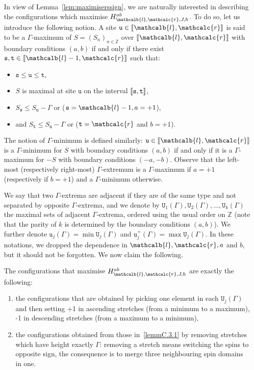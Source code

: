 \documentclass[AHL,Unicode,longabstracts,published]{cedram}
\newcommand{\Z}{\mathbb{Z}}
\newcommand{\bbZ}{\mathbb{Z}}
\newcommand{\gG}{\Gamma}
\renewcommand*\ss{\mathtt{u}}
\newcommand{\ttt}{\mathtt{t}}
\newcommand{\tu}{\ss}
\newcommand{\tU}{\mathtt{U}}
\newcommand{\ts}{\mathtt{s}}
\renewcommand{\ell}{\mathcalb{l}}
\newcommand{\err}{\mathcalc{r}}
\newcommand{\llbracket}{\mathopen{[\mkern -2.7mu[}}
\newcommand{\rrbracket}{\mathclose{]\mkern -2.7mu]}}
\newcommand{\lbra}{\llbracket}
\newcommand{\rbra}{\rrbracket}
\begin{document}
In view of Lemma~\ref{lem:maximiserssign}, we are naturally interested in describing the configurations which maximise $H_{\ell, \err, J, h}^{ab}$. To do so, let us introduce the following notion. A site $\tu\in\lbra \ell, \err \rbra$ is said to be a $\gG$-maximum of $S=(S_n)_{n\in\bbZ}$ over $\lbra \ell, \err \rbra$ with boundary conditions $(a,b)$ if and only if there exist $\ts, \ttt\in\lbra\ell-1, \err\rbra$ such that:
\begin{itemize}
\item $\ts\le \tu\le \ttt$,
\item $S$ is maximal at site $\tu$ on the interval $\lbra\ts, \ttt\rbra$,
\item $S_{\ts}\le S_{\tu}-\gG$ or ($\ts=\ell-1, a=+1$),
\item and $S_{\ttt}\le S_{\tu}-\gG$ or ($\ttt=\err$ and $b=+1$).
\end{itemize}
The notion of $\gG$-minimum is defined similarly: $\tu\in\lbra \ell, \err \rbra$ is a $\gG$-minimum for $S$ with boundary conditions $(a, b)$ if and only if it is a $\gG$-maximum for $-S$ with boundary conditions $(-a, -b)$. Observe that the left-most (respectively right-most) $\gG$-extremum is a $\gG$-maximum if $a=+1$ (respectively if $b=+1$) and a $\gG$-minimum otherwise.

We say that two $\gG$-extrema are adjacent if they are of the same type and not separated by opposite $\gG$-extrema, and we denote by $\tU_1(\gG), \tU_2(\gG), \dots, \tU_k(\gG)$ the maximal sets of adjacent $\gG$-extrema, ordered using the usual order on $\Z$ (note that the parity of $k$ is determined by the boundary conditions $(a, b)$). We further denote $\tu_j(\gG)=\min \tU_j(\gG)$ and $\tu_j^+(\gG)=\max \tU_j(\gG)$. In these notations, we dropped the dependence in $\ell, \err, a$ and $b$, but it should not be forgotten. We now claim the following.

\begin{lemm}\label{lem:descrmaxim}
The configurations that maximise $H_{\ell, \err, J, h}^{ab}$ are exactly the following:
\begin{enumerate}
\item\label{lemmC.3.1} the configurations that are obtained by picking one element in each $\tU_j(\gG)$ and then setting +1 in ascending stretches (from a minimum to a maximum), -1 in descending stretches (from a maximum to a minimum),
\item\label{lemmC.3.2} the configurations obtained from those in~\eqref{lemmC.3.1} by removing stretches which have height exactly $\gG$: removing a stretch means switching the spins to opposite sign, the consequence is to merge three neighbouring spin domains in one.
\end{enumerate}
\end{lemm}
\end{document}
